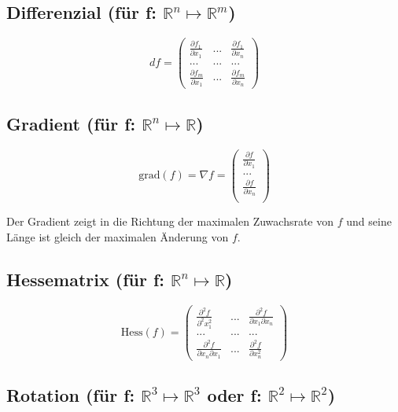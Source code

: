 \documentclass[11pt]{article}
\begin{document}
\subsection{Differenzial (f{\"u}r f: $\mathbb{R}^n \mapsto \mathbb{R}^m$)}

\begin{equation*}
	df = \begin{pmatrix}
		\frac{\partial f_1}{\partial x_1} & ... & \frac{\partial f_1}{\partial x_n} \\
		... & ... & ... \\
		\frac{\partial f_m}{\partial x_1} & ... & \frac{\partial f_m}{\partial x_n}
	\end{pmatrix}
\end{equation*}

\subsection{Gradient (f{\"u}r f: $\mathbb{R}^n \mapsto \mathbb{R}$)}

\begin{equation*}
	\text{grad}(f)=\nabla f=
	\begin{pmatrix}
		\frac{\partial f}{\partial x_1}\\
		...\\
		\frac{\partial f}{\partial x_n}\\
	\end{pmatrix}
\end{equation*}

Der Gradient zeigt in die Richtung der maximalen Zuwachsrate von $f$ und seine L{\"a}nge ist gleich der maximalen {\"A}nderung von $f$.

\subsection{Hessematrix (f{\"u}r f: $\mathbb{R}^n \mapsto \mathbb{R}$)}

\begin{equation*}
	\text{Hess}(f)=
	\begin{pmatrix}
		\frac{\partial^2 f}{\partial^2x_1^2} & ... & \frac{\partial^2 f}{\partial x_1 \partial x_n}\\
		...&...&...\\
		\frac{\partial^2 f}{\partial x_n \partial x_1} & ... & \frac{\partial^2 f}{\partial x_n^2}
	\end{pmatrix}
\end{equation*}

\subsection{Rotation (f{\"u}r f: $\mathbb{R}^3 \mapsto \mathbb{R}^3$ oder f: $\mathbb{R}^2 \mapsto \mathbb{R}^2$)}
\end{document}
